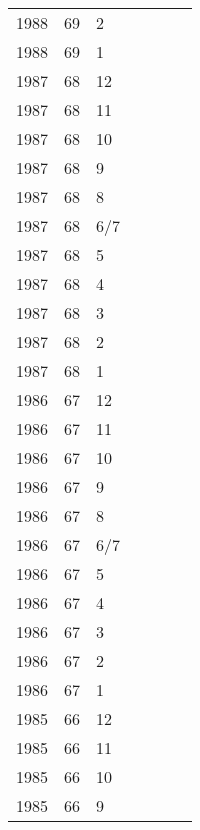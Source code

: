 \begin{longtable}{ |l|l|l|l|p{2.7cm}|l|p{2cm}| }
 1988 & 69 &     2 &         &                &  & \\
 1988 & 69 &     1 &         &                &  & \\
 1987 & 68 &    12 &         &                &  & \\
 1987 & 68 &    11 &         &                &  & \\
 1987 & 68 &    10 &         &                &  & \\
 1987 & 68 &     9 &         &                &  & \\
 1987 & 68 &     8 &         &                &  & \\
 1987 & 68 &   6/7 &         &                &  & \\
 1987 & 68 &     5 &         &                &  & \\
 1987 & 68 &     4 &         &                &  & \\
 1987 & 68 &     3 &         &                &  & \\
 1987 & 68 &     2 &         &                &  & \\
 1987 & 68 &     1 &         &                &  & \\
 1986 & 67 &    12 &         &                &  & \\
 1986 & 67 &    11 &         &                &  & \\
 1986 & 67 &    10 &         &                &  & \\
 1986 & 67 &     9 &         &                &  & \\
 1986 & 67 &     8 &         &                &  & \\
 1986 & 67 &   6/7 &         &                &  & \\
 1986 & 67 &     5 &         &                &  & \\
 1986 & 67 &     4 &         &                &  & \\
 1986 & 67 &     3 &         &                &  & \\
 1986 & 67 &     2 &         &                &  & \\
 1986 & 67 &     1 &         &                &  & \\
 1985 & 66 &    12 &         &                &  & \\
 1985 & 66 &    11 &         &                &  & \\
 1985 & 66 &    10 &         &                &  & \\
 1985 & 66 &     9 &         &                &  & \\

\end{longtable}
